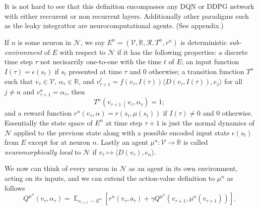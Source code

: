 \documentclass{article} %
\numberwithin{equation}{subsection}
\numberwithin{theorem}{subsection}
\def\expect{\mathop{{\mathbb{E}}}}
\def\suchthat{\mathrel{}\middle|\mathrel{}}
\def\scriptv{{\mathcal V}}
\def\scriptr{{\mathcal R}}
\def\scriptn{{\mathcal N}}
\begin{document}
It is not hard to see that this definition encompasses any DQN or DDPG network with either reccurent or non recurrent layers. Additionally other paradigms such as the leaky integrattor are neurocomputational agents. (See appendix.)

 If $n$ is some neuron in $\scriptn$, we say $E^n = (\scriptv, \mathbb{R}, \scriptr, T^n, r^n)$ is deterministic \emph{sub-environment} of $E$ with respect to $\scriptn$ if it has the following properties: a discrete time step $\tau$ not necisarrily one-to-one with the time $t$ of $E$; an input function $I(\tau) = \epsilon(s_t)$ if $s_t$ presented at time $\tau$ and $0$ otherwise; a transition function $T^n$ such that $v_\tau \in \scriptv$,  $\alpha_\tau \in \mathbb{R}$, and $v_{\tau+1}^j = f(v_\tau, I(\tau)) \langle D(v_\tau, I(\tau)), e_j \rangle$ for all $j \neq n$ and $v_{\tau+1}^n = \alpha_\tau$, then
\begin{equation}
    T^n\left(v_{\tau+1} \suchthat v_\tau, \alpha_\tau\right) = 1;
\end{equation}and a reward function $r^n(v_{\tau}, \alpha) = r(s_t, \mu(s_t))$ if $I(\tau) \neq 0$ and $0$ otherwise. Essentially the state space of $E^n$ at time step $\tau +1$ is just the normal dynamics of $\scriptn$ applied to the previous state along with a possible encoded input state $\epsilon(s_t)$ from $E$ except for at neuron $n$. Lastly an agent  $\mu^n: \scriptv \to \mathbb{R}$  is called \emph{neuromorphically local} to $\scriptn$ if $v_\tau \mapsto \langle D(v_\tau), e_n \rangle$. 

We now can think of every neuron in $\scriptn$ as an agent in its own environment, acting on its inputs, and we can extend the action-value definition to $\mu^n$ as follows
\begin{equation}
    Q^{\mu^n}(v_\tau, \alpha_\tau) = \expect_{v_{\tau+1}\ \sim E^n}\left[r^n(v_\tau, a_\tau) + \gamma Q^{\mu^n}(v_{\tau+1}, \mu^n(v_{\tau+1}))\right].
\end{equation}
\end{document}
